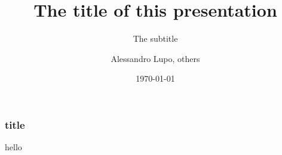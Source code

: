 \documentclass[aspectratio=169,hyperref={pdfpagelabels=false}]{beamer}
\date{\today}
\title{The title of this presentation}
\subtitle{The subtitle}
\author{Alessandro Lupo, others}
\institute{Aix-Marseille Université}
\begin{document}
\maketitle


\begin{frame}
    \frametitle{title}

    hello
    
\end{frame}
\end{document}

